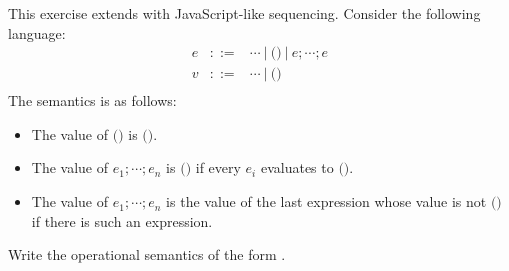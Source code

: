 \begin{exercise}

This exercise extends \lang with JavaScript-like
sequencing.
Consider the following language:
\[
  \begin{array}{rrl}
    e & ::= & \cdots\ |\ \textsf{()}\ |\ e;\cdots;e \\
    v & ::= & \cdots\ |\ \textsf{()} \\
  \end{array}
\]
The semantics is as follows:
\begin{itemize}
  \item
The value of $\textsf{()}$ is $\textsf{()}$.
  \item
The value of $e_1;\cdots;e_n$ is $\textsf{()}$
if every $e_i$ evaluates to $\textsf{()}$.
  \item
The value of $e_1;\cdots;e_n$
is the value of the last expression whose value is not $\textsf{()}$
if there is such an expression.
\end{itemize}
Write the operational semantics of the form .

\end{exercise}
